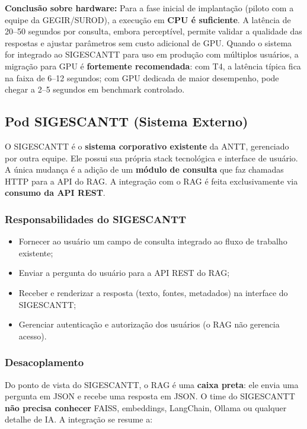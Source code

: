 \documentclass[12pt, a4paper]{article}
\begin{document}
\noindent\textbf{Conclusão sobre hardware:} Para a fase inicial de implantação (piloto com a equipe da GEGIR/SUROD), a execução em \textbf{CPU é suficiente}. A latência de 20--50 segundos por consulta, embora perceptível, permite validar a qualidade das respostas e ajustar parâmetros sem custo adicional de GPU. Quando o sistema for integrado ao SIGESCANTT para uso em produção com múltiplos usuários, a migração para GPU é \textbf{fortemente recomendada}: com T4, a latência típica fica na faixa de 6--12 segundos; com GPU dedicada de maior desempenho, pode chegar a 2--5 segundos em benchmark controlado.



\subsection{Pod SIGESCANTT (Sistema Externo)}

O SIGESCANTT é o \textbf{sistema corporativo existente} da ANTT, gerenciado por outra equipe. Ele possui sua própria stack tecnológica e interface de usuário. A única mudança é a adição de um \textbf{módulo de consulta} que faz chamadas HTTP para a API do RAG. A integração com o RAG é feita exclusivamente via \textbf{consumo da API REST}.

\subsubsection*{Responsabilidades do SIGESCANTT}

\begin{itemize}
  \item Fornecer ao usuário um campo de consulta integrado ao fluxo de trabalho existente;
  \item Enviar a pergunta do usuário para a API REST do RAG;
  \item Receber e renderizar a resposta (texto, fontes, metadados) na interface do SIGESCANTT;
  \item Gerenciar autenticação e autorização dos usuários (o RAG não gerencia acesso).
\end{itemize}

\subsubsection*{Desacoplamento}

Do ponto de vista do SIGESCANTT, o RAG é uma \textbf{caixa preta}: ele envia uma pergunta em JSON e recebe uma resposta em JSON. O time do SIGESCANTT \textbf{não precisa conhecer} FAISS, embeddings, LangChain, Ollama ou qualquer detalhe de IA. A integração se resume a:
\end{document}
